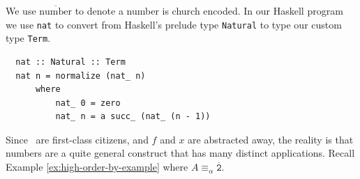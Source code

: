 \begin{notation}
  We use $\overline{\text{number}}$ to denote a number is church encoded. In our Haskell program we use \texttt{nat} to convert from Haskell's prelude type \texttt{Natural} to type our custom type \texttt{Term}.
\begin{verbatim}
  nat :: Natural :: Term
  nat n = normalize (nat_ n)
      where
          nat_ 0 = zero
          nat_ n = a succ_ (nat_ (n - 1))
\end{verbatim}
\end{notation}

\begin{remark}
  Since \lterms \ are first-class citizens, and $f$ and $x$ are abstracted away, the reality is that numbers are a quite general construct that has many distinct applications. Recall Example \ref{ex:high-order-by-example} where $A \equiv_\alpha \overline{\texttt{2}}$.
\end{remark}
